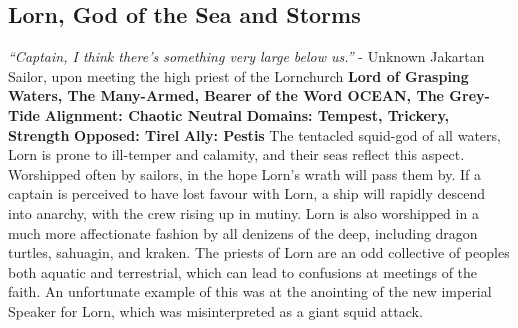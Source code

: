 \subsection{Lorn, God of the Sea and Storms}\label{god:lorn}
\textit{“Captain, I think there’s something very large below us.”}
\break
\hspace*{\fill}- Unknown Jakartan Sailor, upon meeting the high priest of the Lornchurch
\break
\break
\textbf{Lord of Grasping Waters, The Many-Armed, Bearer of the Word OCEAN, The Grey-Tide}\break
\hspace*{\fill}\break
\textbf{Alignment:\hspace*{\fill} Chaotic Neutral} \break
\textbf{Domains:\hspace*{\fill} Tempest, Trickery, Strength} \break
\textbf{Opposed:\hspace*{\fill} Tirel} \break
\textbf{Ally:\hspace*{\fill} Pestis} \break
\hspace*{\fill}\break
The tentacled squid-god of all waters, Lorn is prone to ill-temper and calamity, and their seas reflect this aspect. \newline
Worshipped often by sailors, in the hope Lorn’s wrath will pass them by. If a captain is perceived to have lost favour with Lorn, a ship will rapidly descend into anarchy, with the crew rising up in mutiny. Lorn is also worshipped in a much more affectionate fashion by all denizens of the deep, including dragon turtles, sahuagin, and kraken.\newline
The priests of Lorn are an odd collective of peoples both aquatic and terrestrial, which can lead to confusions at meetings of the faith. An unfortunate example of this was at the anointing of the new imperial Speaker for Lorn, which was misinterpreted as a giant squid attack. 

